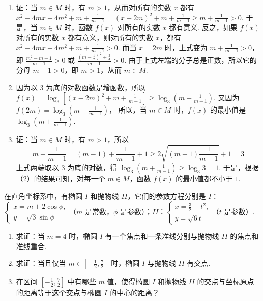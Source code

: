 \begin{solution}
\begin{enumerate}
\item 证：当 \(m \in M\) 时，有 \(m > 1\)，从而对所有的实数 \(x\) 都有
\(x^{2}-4mx+4m^{2}+m+\frac{1}{m-1}=(x-2m)^{2}+m+\frac{1}{m-1}\geqslant m+\frac{1}{m-1}>0\).
于是，当 \(m \in M\) 时，函数 \(f(x)\) 对所有的实数 \(x\) 都有意义.
反之，如果 \(f(x)\) 对所有的实数 \(x\) 都有意义，则对所有的实数 \(x\)，都有
\(x^{2}-4mx+4m^{2}+m+\frac{1}{m-1}>0\).
而当 \(x=2m\) 时，上式变为
\(m+\frac{1}{m-1}>0\)，
即
\(\frac{m^{2}-m+1}{m-1}>0\)
或
\(\frac{\left(m-\frac{1}{2}\right)^{2}+\frac{3}{4}}{m-1}>0\).
由于上式左端的分子总是正数，所以它的分母 \(m-1>0\)，即 \(m>1\)，从而 \(m\in M\).

\item 因为以 \(3\) 为底的对数函数是增函数，所以
\(f(x)=\log_{3}\left[(x-2m)^{2}+m+\frac{1}{m-1}\right]\geqslant\log_{3}\left(m+\frac{1}{m-1}\right)\).
又因为
\(f(2m)=\log_{3}\left(m+\frac{1}{m-1}\right)\)，
所以，当 \(m \in M\) 时，\(f(x)\) 的最小值是
\(\log_{3}\left(m+\frac{1}{m-1}\right)\).

\item 证：当 \(m \in M\) 时，有 \(m > 1\)，所以
\[
m+\frac{1}{m-1}=(m-1)+\frac{1}{m-1}+1\geqslant2\sqrt{(m-1)\frac{1}{m-1}}+1=3
\]
上式两端取以 \(3\) 为底的对数，得
\(\log_{3}\left(m+\frac{1}{m-1}\right)\geqslant\log_{3}3=1\).
于是，根据（2）的结果可知，对每一个 \(m \in M\)，函数 \(f(x)\) 的最小值都不小于 \(1\).
\end{enumerate}
\end{solution}

\begin{problem}

在直角坐标系中，有椭圆 \(I\) 和抛物线 \(II\)，它们的参数方程分别是 \(I\)：\(\begin{cases}
x = m + 2\cos\phi,\\
y = \sqrt{3}\sin\phi
\end{cases}\)（\(m\) 是常数，\(\phi\) 是参数）；\(II\)：\(\begin{cases}
x = \frac{3}{2}+t^{2},\\
y = \sqrt{6}t
\end{cases}\)（\(t\) 是参数）.

\begin{enumerate}
\item 求证：当 \(m=4\) 时，椭圆 \(I\) 有一个焦点和一条准线分别与抛物线 \(II\) 的焦点和准线重合.
\item 求证：当且仅当 \(m \in [-\frac{1}{2}, \frac{7}{2}]\) 时，椭圆 \(I\) 与抛物线 \(II\) 有交点.
\item 在区间 \([-\frac{1}{2}, \frac{7}{2}]\) 中有哪些 \(m\) 值，使得椭圆 \(I\) 和抛物线 \(II\) 的交点与坐标原点的距离等于这个交点与椭圆 \(I\) 的中心的距离？
\end{enumerate}
\end{problem}

